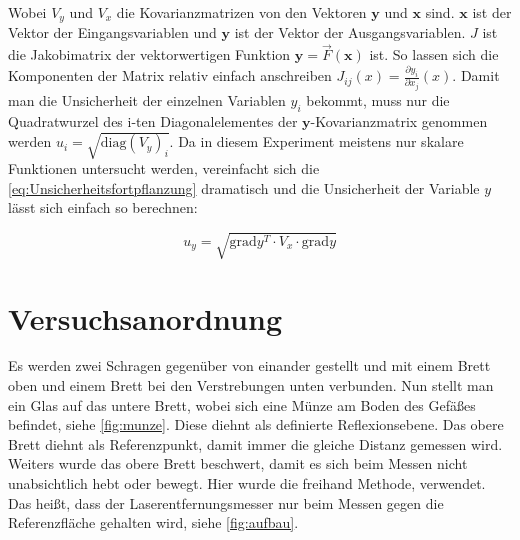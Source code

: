 \documentclass[11pt,ngerman]{scrartcl}
\begin{document}
Wobei $V_y$ und $V_x$ die Kovarianzmatrizen von den Vektoren $\bm{y}$ und $\bm{x}$ sind.
$\bm{x}$ ist der Vektor der Eingangsvariablen und $\bm{y}$ ist der Vektor der Ausgangsvariablen.
$J$ ist die Jakobimatrix der vektorwertigen Funktion $\bm{y} = \vec{F}(\bm{x})$ ist.
So lassen sich die Komponenten der Matrix relativ einfach anschreiben $J_{ij}(x) = \frac{\partial{y_i}}{\partial{x_j}}(x)$.
Damit man die Unsicherheit der einzelnen Variablen $y_i$ bekommt, muss nur die Quadratwurzel des i-ten Diagonalelementes der 
$\bm{y}$-Kovarianzmatrix genommen werden $u_i= \sqrt{\mathrm{diag}(V_y)_i}$.
Da in diesem Experiment meistens nur skalare Funktionen untersucht werden, vereinfacht
sich die \autoref{eq:Unsicherheitsfortpflanzung} dramatisch und die Unsicherheit
der Variable $y$ lässt sich einfach so berechnen:

\begin{equation}
    \label{eq:graduncentainty}
    u_y = \sqrt{\mathrm{grad} y^T \cdot V_x \cdot \mathrm{grad} y}
\end{equation}

\section{Versuchsanordnung}
\label{sec:versuchsanordnung}

Es werden zwei Schragen gegenüber von einander gestellt und mit einem Brett
oben und einem Brett bei den Verstrebungen unten verbunden. Nun stellt man ein
Glas auf das untere Brett, wobei sich eine Münze am Boden des Gefäßes befindet,
siehe \autoref{fig:munze}.  Diese diehnt als definierte Reflexionsebene. Das
obere Brett diehnt als Referenzpunkt, damit immer die gleiche Distanz gemessen
wird. Weiters wurde das obere Brett beschwert, damit es sich beim Messen nicht
unabsichtlich hebt oder bewegt.  Hier wurde die freihand Methode, verwendet.
Das heißt, dass der Laserentfernungsmesser nur beim Messen gegen die
Referenzfläche gehalten wird, siehe \autoref{fig:aufbau}.
\end{document}
